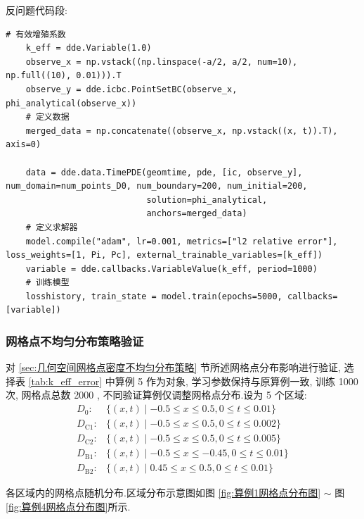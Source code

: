 \documentclass{Sichuan Normal University}
\begin{document}
\indent 反问题代码段:
\begin{lstlisting}[style=python,basicstyle=\footnotesize\fontspec{Courier New},]  
    # 有效增殖系数
    k_eff = dde.Variable(1.0)
    observe_x = np.vstack((np.linspace(-a/2, a/2, num=10), np.full((10), 0.01))).T
    observe_y = dde.icbc.PointSetBC(observe_x, phi_analytical(observe_x))
    # 定义数据
    merged_data = np.concatenate((observe_x, np.vstack((x, t)).T), axis=0)

    data = dde.data.TimePDE(geomtime, pde, [ic, observe_y], num_domain=num_points_D0, num_boundary=200, num_initial=200,
                            solution=phi_analytical,
                            anchors=merged_data)
    # 定义求解器
    model.compile("adam", lr=0.001, metrics=["l2 relative error"], loss_weights=[1, Pi, Pc], external_trainable_variables=[k_eff])
    variable = dde.callbacks.VariableValue(k_eff, period=1000)
    # 训练模型
    losshistory, train_state = model.train(epochs=5000, callbacks=[variable])
\end{lstlisting}
    
\subsubsection{网格点不均匀分布策略验证}

对 \ref{sec:几何空间网格点密度不均匀分布策略} 节所述网格点分布影响进行验证, 选择表 \ref{tab:k_eff_error} 中算例 5 作为对象, 
学习参数保持与原算例一致, 训练 1000 次, 网格点总数 2000 , 不同验证算例仅调整网格点分布.设为 5 个区域:
$$
\begin{array}{ll}
D_0: & \{(x, t) \mid-0.5 \leqslant x \leqslant 0.5,0 \leqslant t \leqslant 0.01\} \\
D_{\mathrm{C} 1}: & \{(x, t) \mid-0.5 \leqslant x \leqslant 0.5,0 \leqslant t \leqslant 0.002\} \\
D_{\mathrm{C} 2}: & \{(x, t) \mid-0.5 \leqslant x \leqslant 0.5,0 \leqslant t \leqslant 0.005\} \\
D_{\mathrm{B} 1}: & \{(x, t) \mid-0.5 \leqslant x \leqslant-0.45,0 \leqslant t \leqslant 0.01\} \\
D_{\mathrm{B} 2}: & \{(x, t) \mid 0.45 \leqslant x \leqslant 0.5,0 \leqslant t \leqslant 0.01\}
\end{array}
$$

各区域内的网格点随机分布.区域分布示意图如图 \ref{fig:算例1网格点分布图} $\sim$ 图 \ref{fig:算例4网格点分布图}所示.
\end{document}
